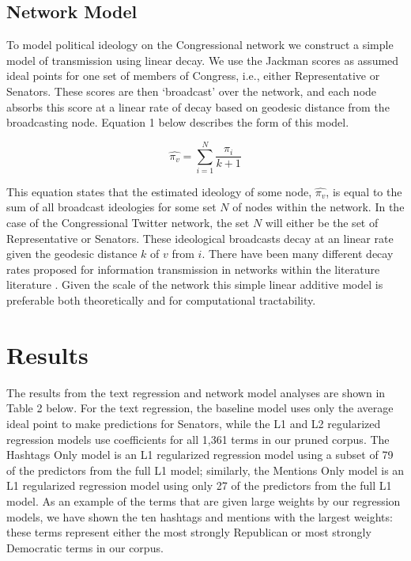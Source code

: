 \documentclass[10pt]{article}
\begin{document}
\subsection{Network Model} %
To model political ideology on the Congressional network we construct a simple model of transmission using linear decay.  We use the Jackman scores as assumed ideal points for one set of members of Congress, i.e., either Representative or Senators.  These scores are then `broadcast' over the network, and each node absorbs this score at a linear rate of decay based on geodesic distance from the broadcasting node.  Equation 1 below describes the form of this model.

\begin{equation}
    \hat{\pi_{v}} = \displaystyle\sum_{i=1}^{N} \frac{\pi_{i}}{k+1}
\end{equation}

This equation states that the estimated ideology of some node, $\hat{\pi_{v}}$, is equal to the sum of all broadcast ideologies for some set $N$ of nodes within the network.  In the case of the Congressional Twitter network, the set $N$ will either be the set of Representative or Senators.  These ideological broadcasts decay at an linear rate given the geodesic distance $k$ of $v$ from $i$.  There have been many different decay rates proposed for information transmission in networks within the literature literature \citep{Wu_2004}.  Given the scale of the network this simple linear additive model is preferable both theoretically and for computational tractability.  

\section{Results}
The results from the text regression and network model analyses are shown in Table 2 below. For the text regression, the baseline model uses only the average ideal point to make predictions for Senators, while the L1 and L2 regularized regression models use coefficients for all 1,361 terms in our pruned corpus. The Hashtags Only model is an L1 regularized regression model using a subset of 79 of the predictors from the full L1 model; similarly, the Mentions Only model is an L1 regularized regression model using only 27 of the predictors from the full L1 model. As an example of the terms that are given large weights by our regression models, we have shown the ten hashtags and mentions with the largest weights: these terms represent either the most strongly Republican or most strongly Democratic terms in our corpus.
\end{document}
